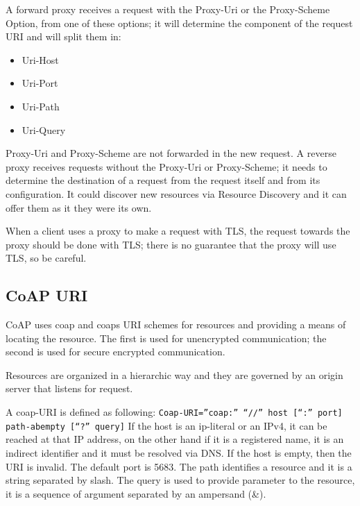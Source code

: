 	A forward proxy receives a request with the Proxy-Uri or the Proxy-Scheme Option, from one of these options; it will determine the component of the request URI and will split them in:
	\begin{itemize}
		\item Uri-Host
		\item Uri-Port
		\item Uri-Path
		\item Uri-Query
	\end{itemize}

	Proxy-Uri and Proxy-Scheme are not forwarded in the new request.\newline
	A reverse proxy receives requests without the Proxy-Uri or Proxy-Scheme; it needs to determine the destination of a request from the request itself and from its configuration.\newline
	It could discover new resources via Resource Discovery and it can offer them as it they were its own.\newline
	
	When a client uses a proxy to make a request with TLS, the request towards the proxy should be done with TLS; there is no guarantee that the proxy will use TLS, so be careful.\newline
	
	\subsection{CoAP URI}
	CoAP uses coap and coaps URI schemes for resources and providing a means of locating the resource.
	The first is used for unencrypted communication; the second is used for secure encrypted communication.
	
	Resources are organized in a hierarchic way and they are governed by an origin server that listens for request.
	
	A coap-URI is defined as following:
	\texttt{Coap-URI=”coap:” “//” host [“:” port] path-abempty [“?” query]}
	If the host is an ip-literal or an IPv4, it can be reached at that IP address, on the other hand if it is a registered name, it is an indirect identifier and it must be resolved via DNS.\newline
	If the host is empty, then the URI is invalid.\newline
	The default port is 5683.\newline
	The path identifies a resource and it is a string separated by slash.\newline
	The query is used to provide parameter to the resource, it is a sequence of argument separated by an ampersand (\&).
	
